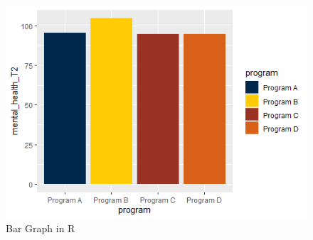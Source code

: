 \documentclass[
]{article}
\begin{document}
\begin{figure}
\centering
\includegraphics[width=0.75\linewidth]{mybarR.png}
\caption{Bar Graph in R}
\end{figure}
\end{document}
